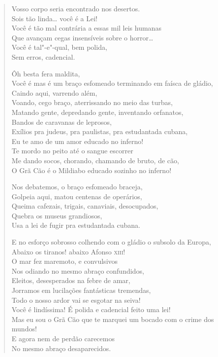 \begin{verse}
Vosso corpo seria encontrado nos desertos.\\
Sois tão linda\ldots{} você é a Lei!\\
Você é tão mal contrária a essas mil leis humanas\\
Que avançam cegas insensíveis sobre o horror\ldots{}\\
Você é tal"-e"-qual, bem polida,\\
Sem erros, cadencial.

Ôh besta fera maldita,\\
Você é mas é um braço esfomeado terminando em faísca de gládio,\\
Caindo aqui, varrendo além,\\
Voando, cego braço, aterrissando no meio das turbas,\\
Matando gente, depredando gente, inventando orfanatos,\\
Bandos de caravanas de leprosos,\\
Exílios pra judeus, pra paulistas, pra estudantada cubana,\\
Eu te amo de um amor educado no inferno!\\
Te mordo no peito até o sangue escorrer\\
Me dando socos, chorando, chamando de bruto, de cão,\\
O Grã Cão é o Mildiabo educado sozinho no inferno!

Nos debatemos, o braço esfomeado braceja,\\
Golpeia aqui, matou centenas de operários,\\
Queima cafezais, trigais, canaviais, desocupados,\\
Quebra os museus grandiosos,\\
Usa a lei de fugir pra estudantada cubana.

E no esforço sobrosso colhendo com o gládio o subsolo da Europa,\\
Abaixo os tiranos! abaixo Afonso \textsc{xiii}!\\
O mar fez maremoto, e convulsivos\\
Nos odiando no mesmo abraço confundidos,\\
Eleitos, desesperados na febre de amar,\\
Jorramos em lucilações fantásticas tremendas,\\
Todo o nosso ardor vai se esgotar na seiva!\\
Você é lindíssima! É polida e cadencial feito uma lei!\\
Mas eu sou o Grã Cão que te marquei um bocado com o crime dos mundos!\\
E agora nem de perdão carecemos\\
No mesmo abraço desaparecidos.
\end{verse}


